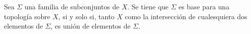 \begin{Prop}
   Sea $\Sigma$ una familia de subconjuntos de $X$. Se tiene que $\Sigma$ es base para una topología sobre $X$, si y solo si, tanto $X$ como la intersección de cualesquiera dos elementos de $\Sigma$, es unión de elementos de $\Sigma$.
\end{Prop}
